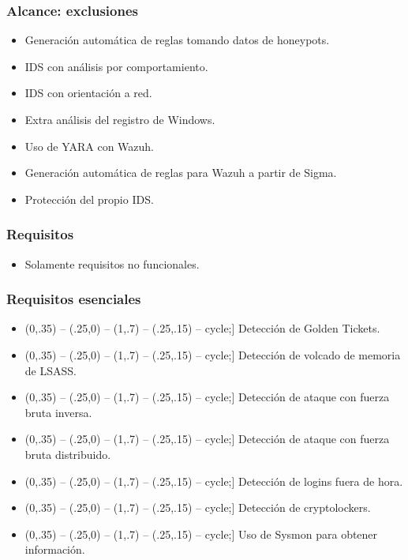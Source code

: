 \documentclass[a4paper,10pt]{beamer}
\def\checkmark{\tikz\fill[scale=0.4,color=black!30!green](0,.35) -- (.25,0) -- (1,.7) -- (.25,.15) -- cycle;}
\begin{document}
\begin{frame}[fragile]
	\frametitle{Alcance: exclusiones}

	\begin{itemize}
		\item Generación automática de reglas tomando datos de honeypots.
		\item IDS con análisis por comportamiento.
		\item IDS con orientación a red.
		\item Extra análisis del registro de Windows.
		\item Uso de YARA con Wazuh.
		\item Generación automática de reglas para Wazuh a partir de Sigma.
		\item Protección del propio IDS.
	\end{itemize}
\end{frame}

\begin{frame}[fragile]
	\frametitle{Requisitos}

	\begin{itemize}
		\item Solamente requisitos no funcionales. %
	\end{itemize}
\end{frame}

\begin{frame}[fragile]
	\frametitle{Requisitos esenciales}

	\begin{itemize}
		\item[\checkmark] Detección de Golden Tickets.
		\item[\checkmark] Detección de volcado de memoria de LSASS.
		\item[\checkmark] Detección de ataque con fuerza bruta inversa.
		\item[\checkmark] Detección de ataque con fuerza bruta distribuido.
		\item[\checkmark] Detección de logins fuera de hora.
		\item[\checkmark] Detección de cryptolockers.
		\item[\checkmark] Uso de Sysmon para obtener información.
	\end{itemize}
\end{frame}
\end{document}
